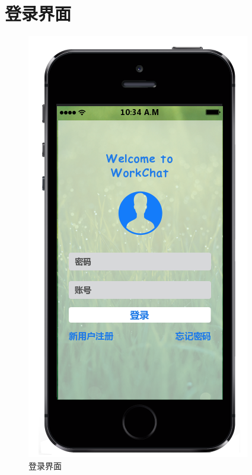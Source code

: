     \section{登录界面}
    \begin{figure}[h]
        \centering
        \includegraphics[scale=0.7]{OutlineDesign/figures/登录界面.png}
        \caption{登录界面}
        \label{fig:server_flow}
    \end{figure}
    \newpage
